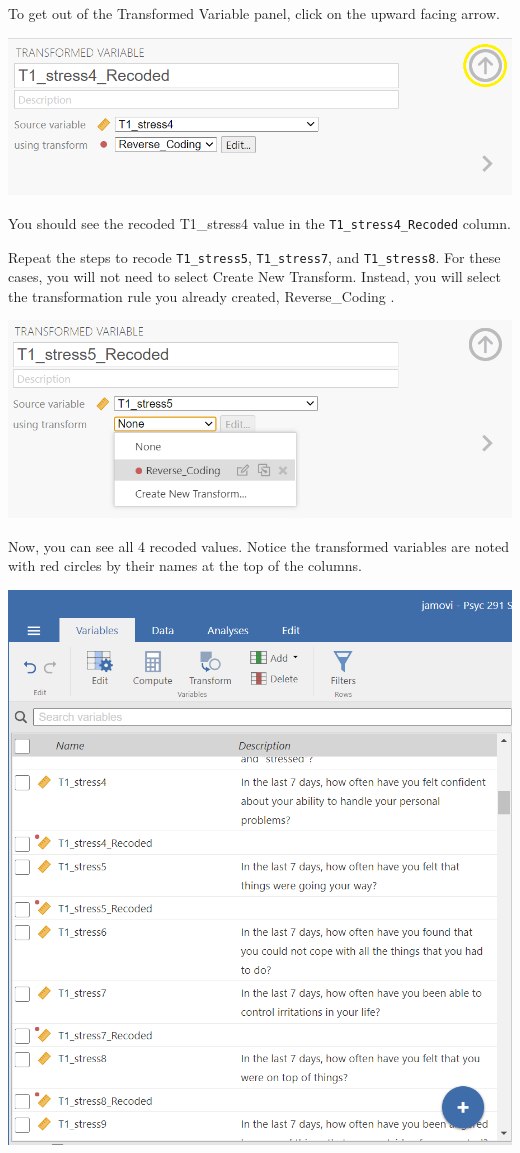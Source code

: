 \documentclass[
]{book}
\begin{document}
To get out of the Transformed Variable panel, click on the upward facing arrow.

\includegraphics{img/StressScale_TransformationToRecodeT1Stress4_7.png}

You should see the recoded T1\_stress4 value in the \texttt{T1\_stress4\_Recoded} column.

Repeat the steps to recode \texttt{T1\_stress5}, \texttt{T1\_stress7}, and \texttt{T1\_stress8}. For these cases, you will not need to select {Create New Transform}. Instead, you will select the transformation rule you already created, {Reverse\_Coding }.

\includegraphics{img/StressScale_TransformationToRecodeT1Stress4_8.png}

Now, you can see all 4 recoded values. Notice the transformed variables are noted with red circles by their names at the top of the columns.

\includegraphics{img/StressScale_TransformationToRecodeT1Stress4_9.png}
\end{document}
